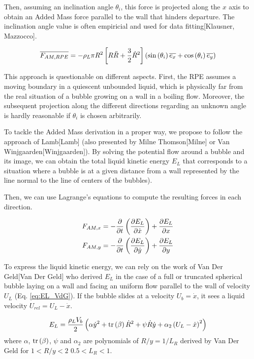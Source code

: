Then, assuming an inclination angle $\theta_{i}$, this force is projected along the $x$ axis to obtain an Added Mass force parallel to the wall that hinders departure. The inclination angle value is often empiricial and used for data fitting[Klausner, Mazzocco]. 

\begin{equation}
\overline{F_{AM,RPE}}=- \rho_{L}\pi R^{2}\left[ R\ddot{R}+\frac{3}{2}\dot{R}^{2} \right]\left( \mathrm{sin}\left( \theta_{i} \right)\overline{e_{x}} + \mathrm{cos}\left( \theta_{i} \right)\overline{e_{y}} \right)
\end{equation}


This approach is questionable on different aspects. First, the RPE assumes a moving boundary in a quiescent unbounded liquid, which is physically far from the real situation of a bubble growing on a wall in a boiling flow. Moreover, the subsequent projection along the different directions regarding an unknown angle is hardly reasonable if $\theta_{i}$ is chosen arbitrarily.


To tackle the Added Mass derivation in a proper way, we propose to follow the approach of Lamb[Lamb] (also presented by Milne Thomson[Milne] or Van Winjgaarden[Winjgaarden]). By solving the potential flow around a bubble and its image, we can obtain the total liquid kinetic energy $E_{L}$ that corresponds to a situation where a bubble is at a given distance from a wall represented by the line normal to the line of centers of the bubbles). 

Then, we can use Lagrange's equations to compute the resulting forces in each direction.


\begin{align}
\label{eq:Lag_x}
F_{AM,x}&=-\frac{\partial }{\partial t}\left( \frac{\partial E_{L}}{\partial \dot{x}} \right)+\frac{\partial E_{L}}{\partial x}\\
\label{eq:Lag_y}
F_{AM,y}&=-\frac{\partial }{\partial t}\left( \frac{\partial E_{L}}{\partial \dot{y}} \right)+\frac{\partial E_{L}}{\partial y}
\end{align}


To express the liquid kinetic energy, we can rely on the work of Van Der Geld[Van Der Geld] who derived $E_{L}$ in the case of a full or truncated spherical bubble laying on a wall and facing an uniform flow parallel to the wall of velocity $U_{L}$ (Eq. \ref{eq:EL_VdG}). If the bubble slides at a velocity $U_{b}=\dot{x}$, it sees a liquid velocity $U_{rel}=U_{L}-\dot{x}$.

\begin{align}
E_{L}=\frac{\rho_{L}V_{b}}{2}\left( \alpha \dot{y}^{2} +\mathrm{tr}\left( \beta \right)\dot{R}^{2}+\psi \dot{R}\dot{y} +\alpha_{2} \left( U_{L}-\dot{x} \right)^{2}  \right)
\label{eq:EL_VdG}
\end{align}
where $\alpha$, $\mathrm{tr}\left( \beta \right)$, $\psi$ and $\alpha_{2}$ are polynomials of $R/y = 1/L_{R}$ derived by Van Der Geld for $1<R/y<2$ \ie $0.5<L_{R}<1$.



